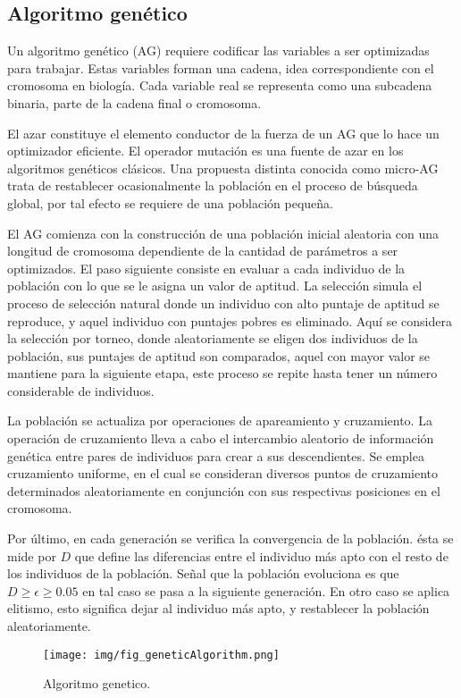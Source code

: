 \subsection{Algoritmo gen\'etico}

Un algoritmo gen\'etico (AG) requiere codificar las variables a
ser optimizadas para trabajar. Estas variables forman
una cadena, idea correspondiente con el cromosoma en biolog\'ia.
Cada variable real se representa como una subcadena
binaria, parte de la cadena final o cromosoma.

El azar constituye el elemento conductor de la fuerza de
un AG que lo hace un optimizador eficiente. El operador mutaci\'on
es una fuente de azar en los algoritmos gen\'eticos cl\'asicos.
Una propuesta distinta conocida como micro-AG trata
de restablecer ocasionalmente la poblaci\'on en el proceso de
b\'usqueda global, por tal efecto se requiere de una poblaci\'on
peque\~na.

El AG comienza con la construcci\'on de una poblaci\'on
inicial aleatoria con una longitud de cromosoma dependiente
de la cantidad de par\'ametros a ser optimizados. El paso
siguiente consiste en evaluar a cada individuo de la poblaci\'on
con lo que se le asigna un valor de aptitud. La selecci\'on simula
el proceso de selecci\'on natural donde un individuo con alto
puntaje de aptitud se reproduce, y aquel individuo con puntajes
pobres es eliminado. Aqu\'i se considera la selecci\'on por
torneo, donde aleatoriamente se eligen dos individuos de la
poblaci\'on, sus puntajes de aptitud son comparados, aquel con
mayor valor se mantiene para la siguiente etapa, este proceso
se repite hasta tener un n\'umero considerable de individuos.

La poblaci\'on se actualiza por operaciones de apareamiento
y cruzamiento. La operaci\'on de cruzamiento lleva a cabo
el intercambio aleatorio de informaci\'on gen\'etica entre pares
de individuos para crear a sus descendientes. Se emplea cruzamiento
uniforme, en el cual se consideran diversos puntos
de cruzamiento determinados aleatoriamente en conjunci\'on
con sus respectivas posiciones en el cromosoma.

Por \'ultimo, en cada generaci\'on se verifica la convergencia
de la poblaci\'on. \'esta se mide por $D$ que define las diferencias
entre el individuo m\'as apto con el resto de los individuos
de la poblaci\'on. Se\~nal que la poblaci\'on evoluciona es que
$D\geq\epsilon\geq0.05$ en tal caso se pasa a la siguiente generaci\'on.
En otro caso se aplica elitismo, esto significa dejar al individuo
m\'as apto, y restablecer la poblaci\'on aleatoriamente.

\begin{figure}[H]
	\centering
	\texttt{[image: img/fig\_geneticAlgorithm.png]}
	\caption{Algoritmo genetico.}
	\label{fig:geneticAlgorithm}
\end{figure}
